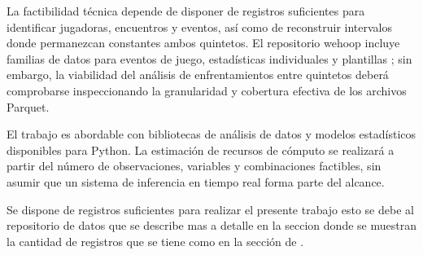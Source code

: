 La factibilidad técnica depende de disponer de registros suficientes para identificar jugadoras, encuentros y eventos, así como de reconstruir intervalos donde permanezcan constantes ambos quintetos. El repositorio wehoop incluye familias de datos para eventos de juego, estadísticas individuales y plantillas \cite{wehoopRepositorio}; sin embargo, la viabilidad del análisis de enfrentamientos entre quintetos deberá comprobarse inspeccionando la granularidad y cobertura efectiva de los archivos Parquet.

El trabajo es abordable con bibliotecas de análisis de datos y modelos estadísticos disponibles para Python. La estimación de recursos de cómputo se realizará a partir del número de observaciones, variables y combinaciones factibles, sin asumir que un sistema de inferencia en tiempo real forma parte del alcance.

Se dispone de registros suficientes para realizar el presente trabajo esto se debe al repositorio de datos \cite{wehoopRepositorio} que se describe mas a detalle en la seccion\textbf{ } donde se muestran la cantidad de registros que se tiene como en la sección de \textbf{}. 